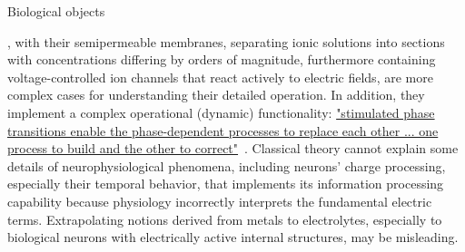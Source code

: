 \hypertarget{AbstractPhysiology}
{Biological objects}, with their semipermeable membranes, separating
ionic solutions into sections with concentrations differing by orders
of magnitude, furthermore containing voltage-controlled ion channels
that react actively to electric fields, are more complex cases for
understanding their detailed operation. In addition, they implement a complex operational (dynamic) functionality: \href{https://www.pnas.org/doi/10.1073/pnas.1705704114}{"stimulated phase transitions enable the phase-dependent processes to replace each other ... one process to build and the other
to correct"}~\cite{BiologicalConservationLaw:2017}. Classical theory cannot explain
some details of neurophysiological phenomena, including neurons' charge
processing, especially their temporal behavior, that implements its
information processing capability because physiology incorrectly interprets
the fundamental electric terms. Extrapolating notions derived from
metals to electrolytes, especially to biological neurons with electrically
active internal structures, may be misleading.


